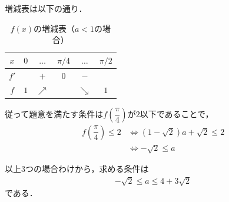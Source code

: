 \documentclass[../../main.tex]{subfiles}
\begin{document}
増減表は以下の通り．
\begin{table}[htb]
  \begin{center}
    \caption{$f(x)$の増減表（$a<1$の場合）}
    \begin{tabular}{c|ccccc}
      $x$ & $0$ & $\dots$ & $\pi/4$ & $\dots$ & $\pi/2$ \\ \hline
      $f'$ & & $+$ & $0$ & $-$ & \\ \hline
      $f$ & $1$ & $\nearrow$ & & $\searrow$ & $1$
    \end{tabular}
  \end{center}
\end{table}

従って題意を満たす条件は$f\left(\dfrac{\pi}{4}\right)$が$2$以下であることで，
\begin{align}
  f\left(\dfrac{\pi}{4}\right) \le 2
  &\iff (1-\sqrt{2})a+\sqrt{2} \le 2 \\
  &\iff -\sqrt{2} \le a
\end{align}
\casesend

以上3つの場合わけから，求める条件は
\begin{align}
  -\sqrt{2} \le a \le 4+3\sqrt{2}
\end{align}
である．

\newpage
\end{document}
